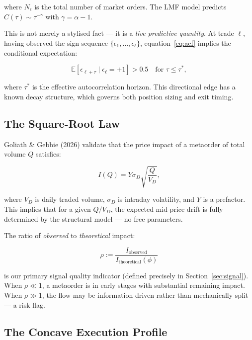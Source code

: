 \documentclass[12pt,a4paper]{article}
\begin{document}
\noindent where $N_\epsilon$ is the total number of market orders. The LMF
model predicts $\hat{C}(\tau) \sim \tau^{-\gamma}$ with $\gamma = \alpha - 1$.

This is not merely a stylised fact --- it is a \emph{live predictive quantity}.
At trade $\ell$, having observed the sign sequence $\{\epsilon_1, \ldots,
\epsilon_\ell\}$, equation~\eqref{eq:acf} implies the conditional expectation:

\begin{equation}
  \mathbb{E}[\epsilon_{\ell+\tau} \mid \epsilon_\ell = +1] > 0.5
  \quad \text{for } \tau \leq \tau^*,
  \label{eq:predictive}
\end{equation}

\noindent where $\tau^*$ is the effective autocorrelation horizon. This
directional edge has a known decay structure, which governs both position sizing
and exit timing.

\subsection{The Square-Root Law}

Goliath \& Gebbie (2026) validate that the price impact of a metaorder of total
volume $Q$ satisfies:

\begin{equation}
  I(Q) = Y \sigma_D \sqrt{\frac{Q}{V_D}},
  \label{eq:sql}
\end{equation}

\noindent where $V_D$ is daily traded volume, $\sigma_D$ is intraday volatility,
and $Y$ is a prefactor. This implies that for a given $Q/V_D$, the expected
mid-price drift is fully determined by the structural model --- no free
parameters.

The ratio of \emph{observed} to \emph{theoretical} impact:

\begin{equation}
  \rho := \frac{I_{\text{observed}}}{I_{\text{theoretical}}(\phi)}
  \label{eq:rho}
\end{equation}

\noindent is our primary signal quality indicator (defined precisely in
Section~\ref{sec:signal}). When $\rho \ll 1$, a metaorder is in early stages
with substantial remaining impact. When $\rho \gg 1$, the flow may be
information-driven rather than mechanically split --- a risk flag.

\subsection{The Concave Execution Profile}
\end{document}
